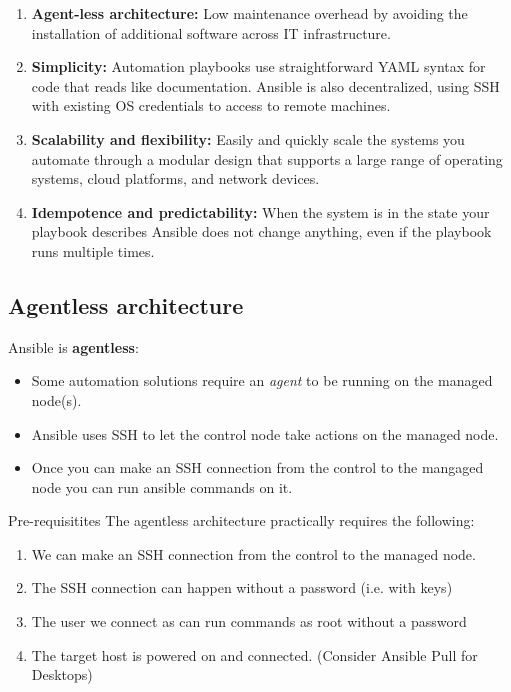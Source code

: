 \documentclass[slides]{pgnotes}
\begin{document}
\begin{enumerate}
\item \textbf{Agent-less architecture:}
Low maintenance overhead by avoiding the installation of additional software across IT infrastructure.

\item \textbf{Simplicity:}
  Automation playbooks use straightforward YAML syntax for code that reads like documentation. Ansible is also decentralized, using SSH with existing OS credentials to access to remote machines.

\item \textbf{Scalability and flexibility:}
Easily and quickly scale the systems you automate through a modular design that supports a large range of operating systems, cloud platforms, and network devices.

\item \textbf{Idempotence and predictability:}
When the system is in the state your playbook describes Ansible does not change anything, even if the playbook runs multiple times.
\end{enumerate}


\subsection{Agentless architecture}

Ansible is \textbf{agentless}:
\begin{itemize}
\item Some automation solutions require an \textit{agent} to be running on the managed node(s).
\item Ansible uses SSH to let the control node take actions on the managed node.
\item Once you can make an SSH connection from the control to the mangaged node you can run ansible commands on it.
\end{itemize}

\begin{redbox}{Pre-requisitites}
  The agentless architecture practically requires the following:
  \begin{enumerate}
  \item We can make an SSH connection from the control to the managed node.
  \item The SSH connection can happen without a password (i.e. with keys)
  \item The user we connect as can run commands as root without a password
  \item The target host is powered on and connected. (Consider Ansible Pull for Desktops)
  \end{enumerate}
\end{redbox}
\end{document}
